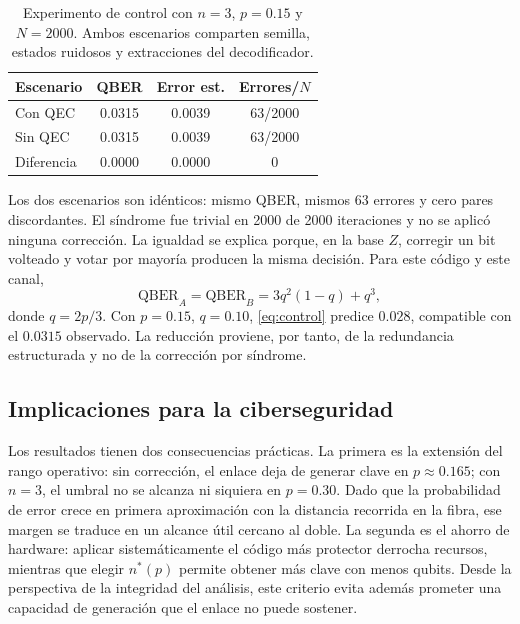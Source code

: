 \documentclass[conference]{IEEEtran}
\begin{document}
\begin{table}[!t]
\renewcommand{\arraystretch}{1.15}
\caption{Experimento de control con \(n=3\), \(p=0.15\) y \(N=2000\). Ambos
escenarios comparten semilla, estados ruidosos y extracciones del decodificador.}
\label{tab:control}
\centering
\begin{tabular}{@{}lccc@{}}
\toprule
Escenario & QBER & Error est. & Errores/\(N\) \\
\midrule
Con QEC & 0.0315 & 0.0039 & 63/2000 \\
Sin QEC & 0.0315 & 0.0039 & 63/2000 \\
Diferencia & 0.0000 & 0.0000 & 0 \\
\bottomrule
\end{tabular}
\end{table}

Los dos escenarios son idénticos: mismo QBER, mismos 63 errores y cero pares
discordantes. El síndrome fue trivial en 2000 de 2000 iteraciones y no se aplicó
ninguna corrección. La igualdad se explica porque, en la base \(Z\), corregir un
bit volteado y votar por mayoría producen la misma decisión. Para este código y
este canal,
\begin{equation}
\mathrm{QBER}_{A}=\mathrm{QBER}_{B}=3q^{2}(1-q)+q^{3},
\label{eq:control}
\end{equation}
donde \(q=2p/3\). Con \(p=0.15\), \(q=0.10\), \eqref{eq:control} predice
\(0.028\), compatible con el \(0.0315\) observado. La reducción proviene, por
tanto, de la redundancia estructurada y no de la corrección por síndrome.

\subsection{Implicaciones para la ciberseguridad}

Los resultados tienen dos consecuencias prácticas. La primera es la extensión
del rango operativo: sin corrección, el enlace deja de generar clave en
$p\approx0.165$; con $n=3$, el umbral no se alcanza ni siquiera en $p=0.30$. Dado
que la probabilidad de error crece en primera aproximación con la distancia
recorrida en la fibra, ese margen se traduce en un alcance útil cercano al doble.
La segunda es el ahorro de hardware: aplicar sistemáticamente el código más
protector derrocha recursos, mientras que elegir $n^{*}(p)$ permite obtener más
clave con menos qubits. Desde la perspectiva de la integridad del análisis, este
criterio evita además prometer una capacidad de generación que el enlace no puede
sostener.
\end{document}

